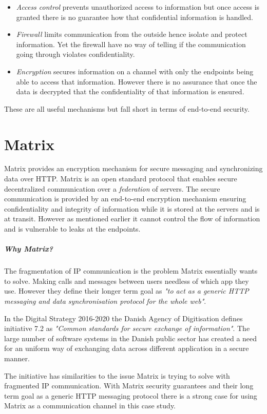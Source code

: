 \begin{itemize}
	\item \emph{Access control} prevents unauthorized access to information but once access is granted there is no guarantee how that confidential information is handled.
	\item \emph{Firewall} limits communication from the outside hence isolate and protect information. Yet the firewall have no way of telling if the communication going through violates confidentiality.
	\item \emph{Encryption} secures information on a channel with only the endpoints being able to access that information. However there is no assurance that once the data is decrypted that the confidentiality of that information is ensured.
\end{itemize}

These are all useful mechanisms but fall short in terms of end-to-end security. 


\section{Matrix}\label{matrix:intro}
Matrix provides an encryption mechanism for secure messaging and synchronizing data over HTTP. Matrix is an open standard protocol that enables secure decentralized communication over a \emph{federation} of servers. The secure communication is provided by an end-to-end encryption mechanism ensuring confidentiality and integrity of information while it is stored at the servers and is at transit. However as mentioned earlier it cannot control the flow of information and is vulnerable to leaks at the endpoints.

\subparagraph{Why Matrix?}
The fragmentation of IP communication is the problem Matrix essentially wants to solve. Making calls and messages between users needless of which app they use. However they define their longer term goal as \emph{"to act as a generic HTTP messaging and data synchronisation protocol for the whole web"}\cite{matrixfaq}.

In the Digital Strategy 2016-2020 the Danish Agency of Digitisation defines initiative 7.2 as \emph{"Common standards for secure exchange of information"}. The large number of software systems in the Danish public sector has created a need for an uniform way of exchanging data across different application in a secure manner\cite{TheGovernment2016}. 

The initiative has similarities to the issue Matrix is trying to solve with fragmented IP communication. With Matrix security guarantees and their long term goal as a generic HTTP messaging protocol there is a strong case for using Matrix as a communication channel in this case study.


